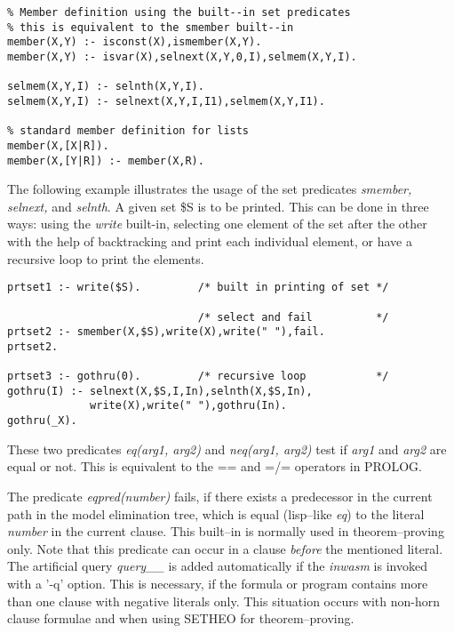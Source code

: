 \begin{verbatim}
% Member definition using the built--in set predicates
% this is equivalent to the smember built--in
member(X,Y) :- isconst(X),ismember(X,Y).
member(X,Y) :- isvar(X),selnext(X,Y,0,I),selmem(X,Y,I).

selmem(X,Y,I) :- selnth(X,Y,I).
selmem(X,Y,I) :- selnext(X,Y,I,I1),selmem(X,Y,I1).

% standard member definition for lists
member(X,[X|R]).
member(X,[Y|R]) :- member(X,R). 
\end{verbatim}

The following example illustrates the usage of the set predicates
{\it smember, selnext,} and {\it selnth}.
A given set \$S is to be printed. This can be done in three ways:
using the {\it write\/} built-in, selecting one element of the set
after the other with the help of backtracking
and print each individual element, or have a recursive loop to
print the elements.

\begin{verbatim}
prtset1 :- write($S).         /* built in printing of set */

                              /* select and fail          */
prtset2 :- smember(X,$S),write(X),write(" "),fail.
prtset2.

prtset3 :- gothru(0).         /* recursive loop           */
gothru(I) :- selnext(X,$S,I,In),selnth(X,$S,In),
             write(X),write(" "),gothru(In).
gothru(_X).
\end{verbatim}

These two predicates {\it eq(arg1, arg2)\/}
and {\it neq(arg1, arg2)\/} test if {\it arg1\/} and {\it arg2\/}
are equal or not. This is equivalent to the == and =/= operators
in PROLOG.

The predicate {\it eqpred(number)\/} fails, if there exists
a predecessor in the current path in the model elimination tree, 
which is equal (lisp--like {\it eq\/}) to the literal {\it number\/}
in the current clause. This built--in is normally used in theorem--proving
only. Note that this predicate can occur in a clause {\em before\/}
the mentioned literal. 
The artificial query {\it query\_\_\/} is added automatically
if the {\it inwasm\/} is invoked with a '-q' option. This is
necessary, if the formula or program contains more than one clause
with negative literals only.
This situation occurs with non-horn clause formulae and when using SETHEO
for theorem--proving.


